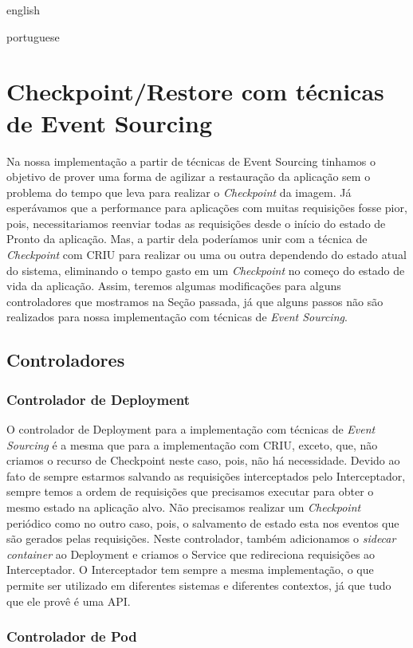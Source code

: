\begin{otherlanguage*}{english}
\begin{otherlanguage*}{portuguese}
\section{Checkpoint/Restore com técnicas de Event Sourcing}

Na nossa implementação a partir de técnicas de Event Sourcing tinhamos o objetivo de
prover uma forma de agilizar a restauração da aplicação sem o problema do tempo que leva
para realizar o \textit{Checkpoint} da imagem. Já esperávamos que a performance para
aplicações com muitas requisições fosse pior, pois, necessitariamos reenviar todas as
requisições desde o início do estado de Pronto da aplicação. Mas, a partir dela
poderíamos unir com a técnica de \textit{Checkpoint} com CRIU para realizar ou uma ou
outra dependendo do estado atual do sistema, eliminando o tempo gasto em um
\textit{Checkpoint} no começo do estado de vida da aplicação. Assim, teremos algumas
modificações para alguns controladores que mostramos na Seção passada, já que alguns
passos não são realizados para nossa implementação com técnicas de \textit{Event Sourcing}.

\subsection{Controladores}

\subsubsection{Controlador de Deployment}

O controlador de Deployment para a implementação com técnicas de \textit{Event Sourcing} é
a mesma que para a implementação com CRIU, exceto, que, não criamos o recurso de Checkpoint neste
caso, pois, não há necessidade. Devido ao fato de sempre estarmos salvando as requisições
interceptados pelo Interceptador, sempre temos a ordem de requisições que precisamos
executar para obter o mesmo estado na aplicação alvo. Não precisamos realizar um
\textit{Checkpoint} periódico como no outro caso, pois, o salvamento de estado esta nos
eventos que são gerados pelas requisições. Neste controlador, também adicionamos o 
\textit{sidecar container} ao Deployment e criamos o Service que redireciona requisições
ao Interceptador. O Interceptador tem sempre a mesma implementação, o que permite ser
utilizado em diferentes sistemas e diferentes contextos, já que tudo que ele provê é uma
API.

\subsubsection{Controlador de Pod}


\end{otherlanguage*}
\end{otherlanguage*}
